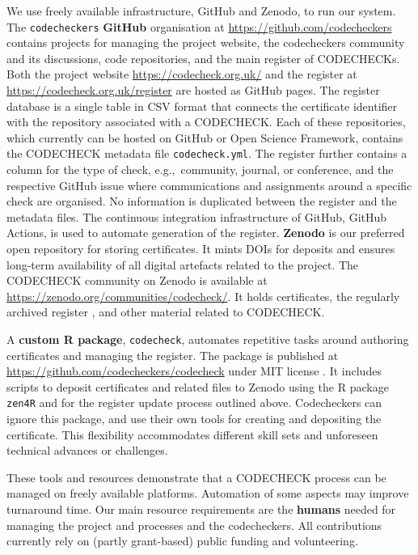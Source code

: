 \documentclass[12pt]{article}
\begin{document}
We use freely available infrastructure, GitHub and Zenodo, to run our
system.  The \texttt{codecheckers} \textbf{GitHub} organisation at
\url{https://github.com/codecheckers} contains projects for managing
the project website, the codecheckers community and its discussions,
code repositories, and the main register of CODECHECKs. Both the
project website \url{https://codecheck.org.uk/} and the register at
\url{https://codecheck.org.uk/register} are hosted as GitHub pages.
The register database is a single table in CSV format that connects
the certificate identifier with the repository associated with a
CODECHECK. Each of these repositories, which currently can be hosted
on GitHub or Open Science Framework, contains the CODECHECK
metadata file \texttt{codecheck.yml}. The register further contains a
column for the type of check, e.g.,~community, journal, or conference,
and the respective GitHub issue where communications and assignments
around a specific check are organised. No information is duplicated
between the register and the metadata files. The continuous
integration infrastructure of GitHub, GitHub Actions, is used to
automate generation of the register.  \textbf{Zenodo} is our preferred open
repository for storing certificates. It mints DOIs for deposits and
ensures long-term availability of all digital artefacts related to the
project. The CODECHECK community on Zenodo is available at
\url{https://zenodo.org/communities/codecheck/}. It holds
certificates, the regularly archived register
\cite{codecheck_register_jan2021}, and other material related to
CODECHECK.

A \textbf{custom R package}, \texttt{codecheck}, automates
repetitive tasks around authoring certificates and managing the
register. The package is published at
\url{https://github.com/codecheckers/codecheck} under MIT license
\cite{stephen_eglen_codecheckerscodecheck_2021}.
It includes scripts to deposit certificates and related
files to Zenodo using the R package \texttt{zen4R} \cite{zen4r} and
for the register update process outlined above.  Codecheckers can
ignore this package, and use their own tools for creating
and depositing the certificate.  This flexibility  accommodates
different skill sets and unforeseen technical advances or challenges.

These tools and resources demonstrate that a CODECHECK process can be
managed on freely available platforms.
Automation of some aspects may improve turnaround time. Our main
resource requirements are the \textbf{humans} needed for managing the
project and processes and the codecheckers.  All contributions
currently rely on (partly grant-based) public funding and
volunteering.
\end{document}
